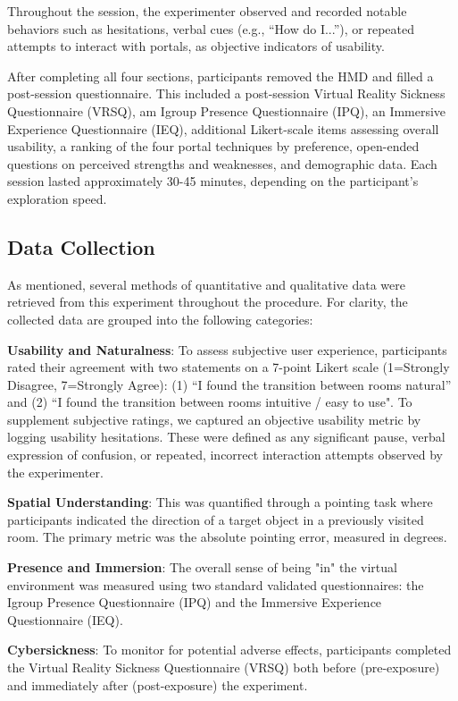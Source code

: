 Throughout the session, the experimenter observed and recorded notable behaviors such as hesitations, verbal cues (e.g., “How do I...”), 
or repeated attempts to interact with portals, as objective indicators of usability.  

After completing all four sections, participants removed the \gls{HMD} and filled a post-session questionnaire. This included a post-session 
Virtual Reality Sickness Questionnaire (VRSQ), am Igroup Presence Questionnaire (IPQ), an Immersive Experience Questionnaire (IEQ), 
additional Likert-scale items assessing overall usability, a ranking of the four portal techniques by preference, open-ended questions on perceived 
strengths and weaknesses, and demographic data. Each session lasted approximately 30-45 minutes, depending on the participant's exploration speed.


\subsection{Data Collection}
\label{sec:data}

As mentioned, several methods of quantitative and qualitative data were retrieved from this experiment throughout the procedure.  
For clarity, the collected data are grouped into the following categories:

\textbf{Usability and Naturalness}: To assess subjective user experience, participants rated their agreement with two statements on a 7-point Likert scale (1=Strongly Disagree, 7=Strongly Agree): (1) “I found the transition between rooms natural” and (2) “I found the transition between rooms intuitive / easy to use". To supplement subjective ratings, we captured an objective usability metric by logging usability hesitations. These were defined as any significant pause, verbal expression of confusion, or repeated, incorrect interaction attempts observed by the experimenter.

\textbf{Spatial Understanding}: This was quantified through a pointing task where participants indicated the direction of a target object in a previously visited room. The primary metric was the absolute pointing error, measured in degrees.

\textbf{Presence and Immersion}: The overall sense of being "in" the virtual environment was measured using two standard validated questionnaires: the Igroup Presence Questionnaire (IPQ) and the Immersive Experience Questionnaire (IEQ).

\textbf{Cybersickness}: To monitor for potential adverse effects, participants completed the Virtual Reality Sickness Questionnaire (VRSQ) both before (pre-exposure) and immediately after (post-exposure) the experiment.

